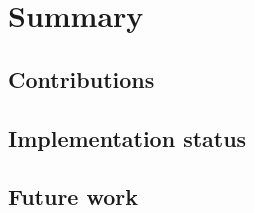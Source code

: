 \documentclass[../thesis]{subfiles}
\begin{document}
\chapter{Summary}


\section{Contributions}

\section{Implementation status}

\section{Future work}
\end{document}

